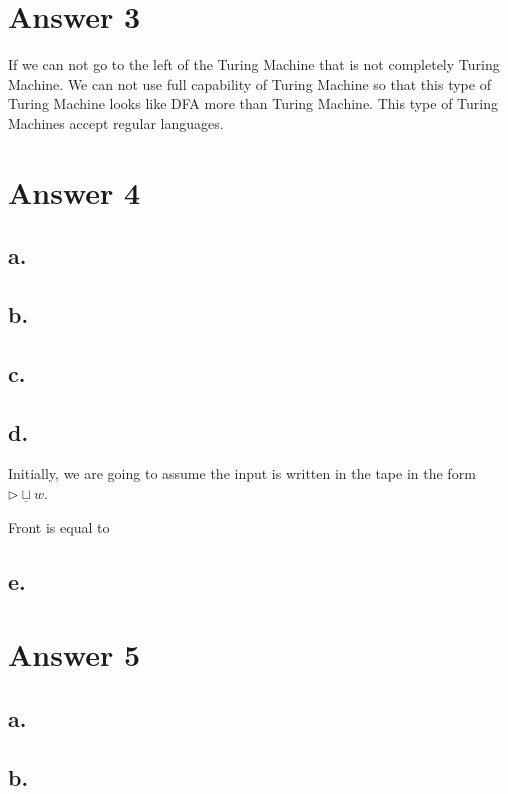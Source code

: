\documentclass[12pt]{article}
\begin{document}
\section*{Answer 3}

If we can not go to the left of the Turing Machine that is not completely Turing Machine. We can not use full capability of Turing Machine so that this type of Turing Machine looks like DFA more than Turing Machine. This type of Turing Machines accept regular languages.


\section*{Answer 4}


\subsection*{a.}

\subsection*{b.}

\subsection*{c.}

\subsection*{d.}

Initially, we are going to assume the input is written in the tape in the form $\triangleright\underline{\sqcup}w$.

Front is equal to

\subsection*{e.}




\section*{Answer 5}

\subsection*{a.}

\subsection*{b.}
\end{document}
